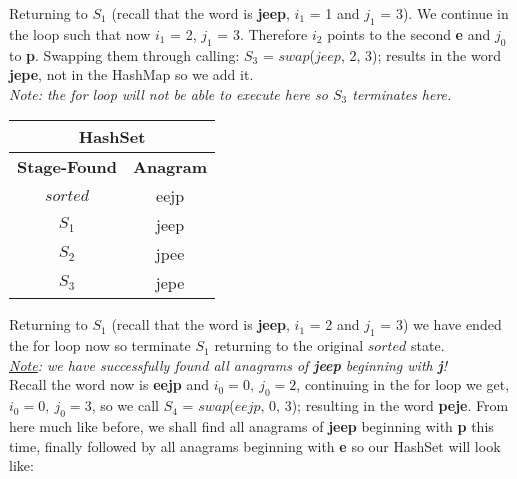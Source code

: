 \documentclass[12pt]{article}
\begin{document}
Returning to $S_1$ (recall that the word is \textbf{jeep}, $i_1$ = 1 and $j_1$ = 3). We continue in the loop
such that now  $i_1$ = 2, $j_1$ = 3. Therefore $i_2$ points to the second \textbf{e} and $j_0$ to \textbf{p}. Swapping
them through calling: $S_3$ = $swap$($jeep$, 2, 3); results in the word \textbf{jepe}, not in the HashMap so we add it. \\
\indent \textit{Note: the for loop will not be able to execute here so $S_3$ terminates here.}

\begin{center}
\begin{tabular}{ |c|c| }
    \hline
    \multicolumn{2}{|c|}{HashSet} \\
    \hline
    \textbf{Stage-Found} & \textbf{Anagram} \\
    \hline
    $sorted$ & eejp \\
    \hline
    $S_1$ & jeep \\
    \hline
    $S_2$ & jpee \\
    \hline
    $S_3$ & jepe \\
    \hline
\end{tabular}
\end{center}

Returning to $S_1$ (recall that the word is \textbf{jeep}, $i_1$ = 2 and $j_1$ = 3) we have ended the for loop now so
terminate $S_1$ returning to the original $sorted$ state.
\\ \indent \textit{\underline{Note}: we have successfully found all anagrams of \textbf{jeep} beginning with \textbf{j}!}
\\ Recall  the word now is \textbf{eejp} and $i_0 = 0,\ j_0 = 2$, continuing in the for loop we get,
$i_0 = 0,\ j_0 = 3$, so we call $S_4$ =  $swap$($eejp$, 0, 3); resulting in the word \textbf{peje}. From
here much like before, we shall find all anagrams of \textbf{jeep} beginning with \textbf{p} this time, finally followed
by all anagrams beginning with \textbf{e} so our HashSet will look like:
\end{document}
